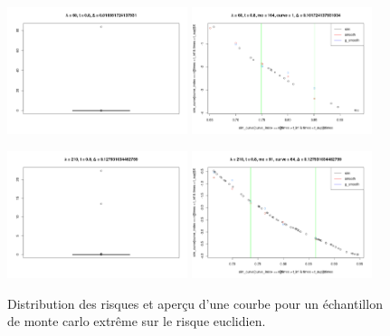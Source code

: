 \begin{figure}[H]
	\centering
	\begin{minipage}{\linewidth}
		\includegraphics[width=0.47\textwidth]{Images/indiv_vs_glob/qq160.png}
		\includegraphics[width=0.47\textwidth]{Images/indiv_vs_glob/lbd60mc164c1.png}
	\end{minipage}

	\begin{minipage}{\linewidth}
		\includegraphics[width=0.47\textwidth]{Images/indiv_vs_glob/qq210.png}
		\includegraphics[width=0.47\textwidth]{Images/indiv_vs_glob/lbd210_mc91_c64.png}
	\end{minipage}
	\caption{Distribution des risques et aperçu d'une courbe pour un échantillon de monte carlo extrême sur le risque euclidien.}
	\label{fig:dist_R_eucl_curves}
\end{figure}

